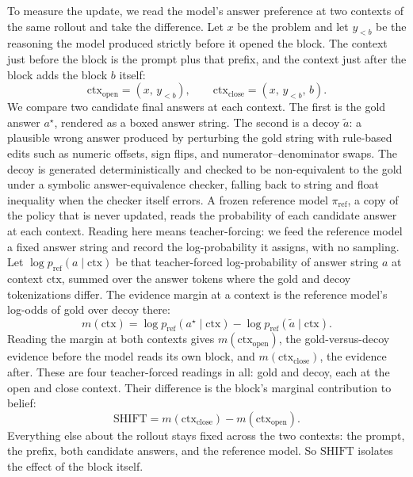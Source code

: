 To measure the update, we read the model's answer preference at two contexts of
the same rollout and take the difference. Let $x$ be the problem and let
$y_{<b}$ be the reasoning the model produced strictly before it opened the block.
The context just before the block is the prompt plus that prefix, and the context
just after the block adds the block $b$ itself:
\begin{equation}
\mathrm{ctx}_{\mathrm{open}} = (x,\, y_{<b}),
\qquad
\mathrm{ctx}_{\mathrm{close}} = (x,\, y_{<b},\, b).
\label{eq:contexts}
\end{equation}
We compare two candidate final answers at each context. The first is the gold
answer $a^{\star}$, rendered as a boxed answer string. The second is a decoy
$\tilde{a}$: a plausible wrong answer produced by perturbing the gold string with
rule-based edits such as numeric offsets, sign flips, and numerator--denominator
swaps. The decoy is generated deterministically and checked to be non-equivalent
to the gold under a symbolic answer-equivalence checker, falling back to string
and float inequality when the checker itself errors. A frozen reference model
$\pi_{\mathrm{ref}}$, a copy of the policy that is never updated, reads the
probability of each candidate answer at each context. Reading here means
teacher-forcing: we feed the reference model a fixed answer string and record the
log-probability it assigns, with no sampling. Let
$\log p_{\mathrm{ref}}(a \mid \mathrm{ctx})$ be that teacher-forced log-probability
of answer string $a$ at context $\mathrm{ctx}$, summed over the answer tokens
where the gold and decoy tokenizations differ. The evidence margin at a context
is the reference model's log-odds of gold over decoy there:
\begin{equation}
m(\mathrm{ctx})
= \log p_{\mathrm{ref}}(a^{\star} \mid \mathrm{ctx})
- \log p_{\mathrm{ref}}(\tilde{a} \mid \mathrm{ctx}).
\label{eq:margin}
\end{equation}
Reading the margin at both contexts gives $m(\mathrm{ctx}_{\mathrm{open}})$, the
gold-versus-decoy evidence before the model reads its own block, and
$m(\mathrm{ctx}_{\mathrm{close}})$, the evidence after. These are four
teacher-forced readings in all: gold and decoy, each at the open and close
context. Their difference is the block's marginal contribution to belief:
\begin{equation}
\mathrm{SHIFT}
= m(\mathrm{ctx}_{\mathrm{close}}) - m(\mathrm{ctx}_{\mathrm{open}}).
\label{eq:shift}
\end{equation}
Everything else about the rollout stays fixed across the two contexts: the
prompt, the prefix, both candidate answers, and the reference model. So
$\mathrm{SHIFT}$ isolates the effect of the block itself.


